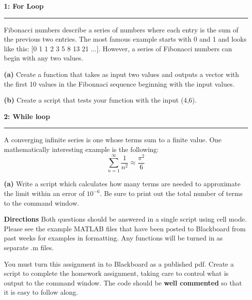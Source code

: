 \documentclass[11pt]{article}
\newcommand\question[2]{\vspace{.25in}\textbf{#1: #2}\vspace{.5em}\hrule\vspace{.10in}}
\renewcommand\part[1]{\vspace{.10in}\textbf{(#1)}}
\begin{document}
\raggedright

\question{1}{For Loop} 

Fibonacci numbers describe a series of numbers where each entry is the sum of the previous two entries. The most famous example starts with 0 and 1 and looks like this: [0 1 1 2 3 5 8 13 21 ...]. However, a series of Fibonacci numbers can begin with any two values. 

\part{a} Create a function that takes as input two values and outputs a vector with the first 10 values in the Fibonnaci sequence beginning with the input values.

\part{b} Create a script that tests your function with the input (4,6). 

\question{2}{While loop}
A converging infinite series is one whose terms sum to a finite value. One mathematically interesting example is the following: 
\begin{equation}
\sum_{n=1}^{\infty} \frac{1}{n^2} \approx \frac{\pi^2}{6}
\end{equation}

\part{a} Write a script which calculates how many terms are needed to approximate the limit within an error of $10^{-6}$. 
Be sure to print out the total number of terms to the command window.

\vspace{1.0em}
\textbf{Directions}
Both questions should be answered in a single script using cell mode. Please see the example MATLAB files that have been posted to Blackboard from past weeks for examples in formatting. Any functions will be turned in as separate .m files.

You must turn this assignment in to Blackboard as a published pdf. Create a script to complete the homework assignment, taking care to control what is output to the command window. The code should be \textbf{well commented} so that it is easy to follow along. 
\end{document}
